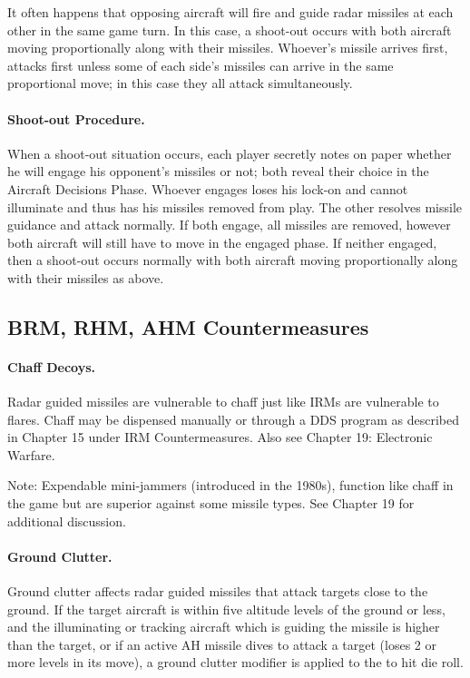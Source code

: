 It often happens that opposing aircraft will fire and guide radar missiles at each other in the same game turn. In this case, a shoot-out occurs with both aircraft moving proportionally along with their missiles. Whoever’s missile arrives first, attacks first unless some of each side's missiles can arrive in the same proportional move; in this case they all attack simultaneously.

\paragraph{Shoot-out Procedure.} When a shoot-out situation occurs, each player secretly notes on paper whether he will engage his opponent's missiles or not; both reveal their choice in the Aircraft Decisions Phase. Whoever engages loses his lock-on and cannot illuminate and thus has his missiles removed from play. The other resolves missile guidance and attack normally. If both engage, all missiles are removed, however both aircraft will still have to move in the engaged phase. If neither engaged, then a shoot-out occurs normally with both aircraft moving proportionally along with their missiles as above.

\subsection{BRM, RHM, AHM Countermeasures}

\paragraph{Chaff Decoys.} Radar guided missiles are vulnerable to chaff just like IRMs are vulnerable to flares. Chaff may be dispensed manually or through a DDS program as described in Chapter 15 under IRM Countermeasures. Also see Chapter 19: Electronic Warfare.

Note: Expendable mini-jammers (introduced in the 1980s), function like chaff in the game but are superior against some missile types. See Chapter 19 for additional discussion.

\paragraph{Ground Clutter.} Ground clutter affects radar guided missiles that attack targets close to the ground. If the target aircraft is within five altitude levels of the ground or less, and the illuminating or tracking aircraft which is guiding the missile is higher than the target, or if an active AH missile dives to attack a target (loses 2 or more levels in its move), a ground clutter modifier is applied to the to hit die roll.

